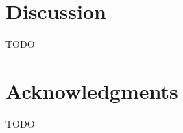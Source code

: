\documentclass[fleqn,moreauthors,10pt]{ds_report}
\begin{document}




\section*{Discussion}

TODO



\section*{Acknowledgments}
TODO




\end{document}
